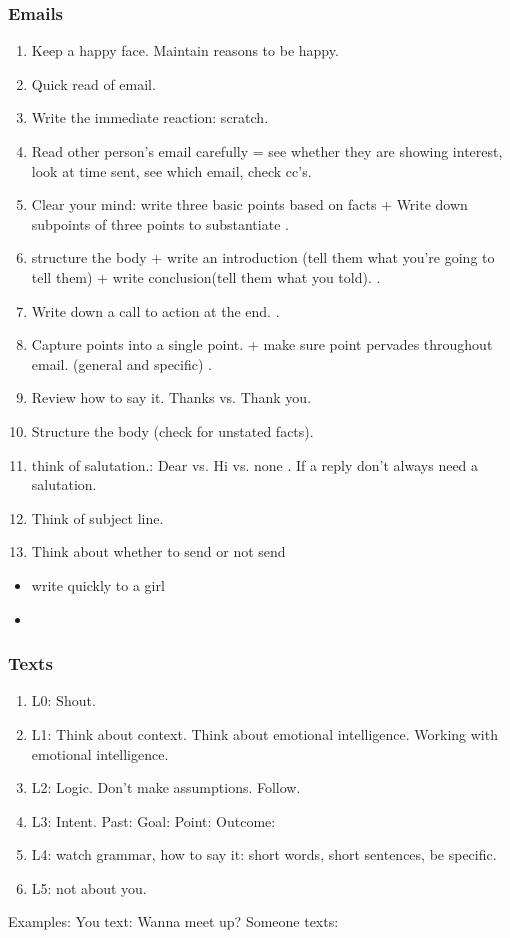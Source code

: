\begin{frame}[label=emails] 
\frametitle{Emails} 

 
\begin{enumerate}
\tiny \item \tiny Keep a happy face. Maintain reasons to be happy. 
\item \tiny Quick read of email. 
\item \tiny Write the immediate reaction: scratch. 
\item \tiny Read other person's email carefully = see whether they are
  showing interest, look at time sent, see which email, check cc's. 
\item \tiny Clear your mind: write three basic points based on facts +
Write down subpoints of three points to substantiate . 
\item \tiny structure the body + write an introduction (tell them what
  you're going to tell them) + write conclusion(tell them what you
  told). . 
\item \tiny Write down a call to action at the end.  . 
\item \tiny Capture points into a single point. + make sure point
  pervades throughout email. (general and specific) . 
\item \tiny Review how to say it. Thanks vs. Thank you.  
\item \tiny Structure the body (check for unstated facts).  
\item \tiny think of salutation.: Dear vs. Hi vs. none .  If a reply
  don't always need a salutation.  
\item \tiny Think of subject line. 
\item \tiny Think about whether to send or not send  
\end{enumerate} 
\begin{itemize} 
\tiny \item \tiny write quickly to a girl 
\item \tiny
\end{itemize}
\end{frame}


\begin{frame}[label=texts]
\frametitle{Texts} 
\begin{enumerate}
\tiny \item \tiny L0: Shout.  
\item \tiny L1: Think about context. Think about emotional
  intelligence. Working with emotional intelligence.  
\item \tiny L2: Logic. Don't make assumptions. Follow.
\item \tiny L3: Intent. Past: Goal: Point: Outcome: 
\item \tiny L4: watch grammar, how to say it: short words, short
  sentences, be specific.
\item \tiny L5: not about you.   
\end{enumerate}
Examples:  
You text: 
Wanna meet up? 
Someone texts:  
\end{frame} 


